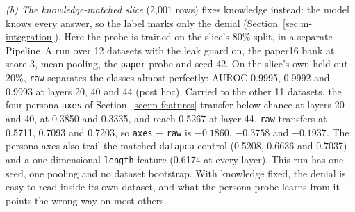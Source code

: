 \emph{(b) The knowledge-matched slice} (2{,}001 rows) fixes knowledge instead: the model knows every answer, so the label marks only the denial (Section~\ref{sec:m-integration}). %
Here the probe is trained on the slice's 80\% split, in a separate Pipeline~A run over 12 datasets with the leak guard on, the paper16 bank at score 3, mean pooling, the \texttt{paper} probe and seed 42. %
On the slice's own held-out 20\%, \texttt{raw} separates the classes almost perfectly: AUROC 0.9995, 0.9992 and 0.9993 at layers 20, 40 and 44 (post hoc). %
Carried to the other 11 datasets, the four persona \texttt{axes} of Section~\ref{sec:m-features} transfer below chance at layers 20 and 40, at 0.3850 and 0.3335, and reach 0.5267 at layer 44. %
\texttt{raw} transfers at 0.5711, 0.7093 and 0.7203, so \texttt{axes} $-$ \texttt{raw} is $-0.1860$, $-0.3758$ and $-0.1937$. %
The persona axes also trail the matched \texttt{datapca} control (0.5208, 0.6636 and 0.7037) and a one-dimensional \texttt{length} feature (0.6174 at every layer). %
This run has one seed, one pooling and no dataset bootstrap. %
With knowledge fixed, the denial is easy to read inside its own dataset, and what the persona probe learns from it points the wrong way on most others. %

